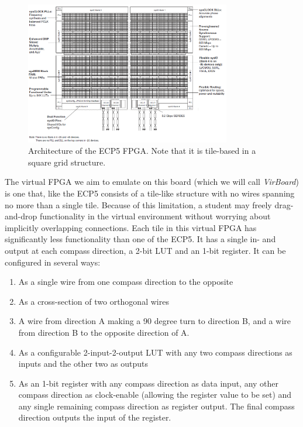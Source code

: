 \begin{figure}
\centering
\includegraphics[width=0.8\textwidth]{images/ECP5Architecture.png}
\caption[Architecture of the ECP5 FPGA. Note that it is tile-based in a square grid structure]{Architecture of the ECP5 FPGA. Note that it is tile-based in a square grid structure.\footnotemark}
\label{fig:ecp5architecture}
\end{figure}

The virtual FPGA we aim to emulate on this board (which we will call \textit{VirBoard}) is one that, like the ECP5 consists of a tile-like structure with no wires spanning no more than a single tile. Because of this limitation, a student may freely drag-and-drop functionality in the virtual environment without worrying about implicitly overlapping connections. Each tile in this virtual FPGA has significantly less functionality than one of the ECP5. It has a single in- and output at each compass direction, a 2-bit LUT and an 1-bit register. It can be configured in several ways:

\begin{enumerate}
\item As a single wire from one compass direction to the opposite
\item As a cross-section of two orthogonal wires
\item A wire from direction A making a 90 degree turn to direction B, and a wire from direction B to the opposite direction of A.
\item As a configurable 2-input-2-output LUT with any two compass directions as inputs and the other two as outputs
\item As an 1-bit register with any compass direction as data input, any other compass direction as clock-enable (allowing the register value to be set) and any single remaining compass direction as register output. The final compass direction outputs the input of the register.
\end{enumerate}

